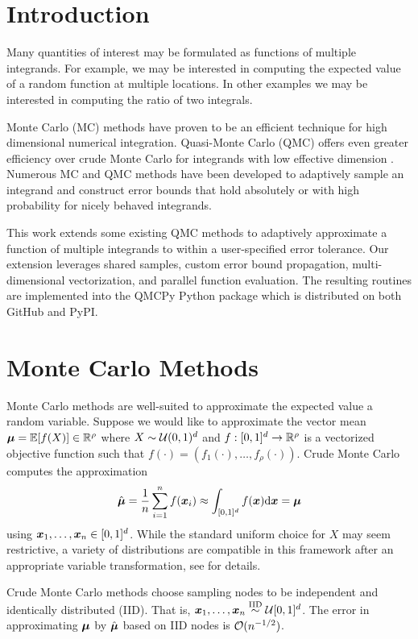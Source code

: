 \documentclass{article}[12pt]
\begin{document}
\section{Introduction}

Many quantities of interest may be formulated as functions of multiple integrands. For example, we may be interested in computing the expected value of a random function at multiple locations. In other examples we may be interested in computing the ratio of two integrals.

Monte Carlo (MC) methods have proven to be an efficient technique for high dimensional numerical integration. Quasi-Monte Carlo (QMC) offers even greater efficiency over crude Monte Carlo for integrands with low effective dimension . Numerous MC and QMC methods have been developed to adaptively sample an integrand and construct error bounds that hold absolutely or with high probability for nicely behaved integrands. 

This work extends some existing QMC methods to adaptively approximate a function of multiple integrands to within a user-specified error tolerance. Our extension leverages shared samples, custom error bound propagation, multi-dimensional vectorization, and parallel function evaluation. The resulting routines are implemented into the QMCPy Python package \cite{QMCPy} which is distributed on both GitHub and PyPI. 

\section{Monte Carlo Methods}

Monte Carlo methods are well-suited to approximate the expected value a random variable. Suppose we would like to approximate the vector mean $\boldsymbol{\mu} = \mathbb{E}[f(X)] \in \mathbb{R}^\rho$ where $X\sim\mathcal{U}(0,1)^d$ and  $f: [0,1]^d \to \mathbb{R}^\rho$ is a vectorized objective function such that $f(\cdot)=(f_1(\cdot),\dots,f_\rho(\cdot))$.  Crude Monte Carlo computes the approximation 
\begin{equation}
    \label{eq:mcapprox}
    \hat{\boldsymbol{\mu}} = \frac{1}{n}\sum_{i=1}^n f(\boldsymbol{x}_i) \approx \int_{[0,1]^d}f(\boldsymbol{x})\mathrm{d}\boldsymbol{x} = \boldsymbol{\mu}
\end{equation}
using $\boldsymbol{x}_1,\dots,\boldsymbol{x}_n \in [0,1]^d$. While the standard uniform choice for $X$ may seem restrictive, a variety of distributions are compatible in this framework after an appropriate variable transformation, see \cite{QMCSoftware} for details.

Crude Monte Carlo methods choose sampling nodes to be independent and identically distributed (IID). That is, $\boldsymbol{x}_1,\dots,\boldsymbol{x}_n \overset{\text{IID}}{\sim} \mathcal{U}[0,1]^d$.
The error in approximating $\boldsymbol{\mu}$ by $\hat{\boldsymbol{\mu}}$ based on IID nodes is  $\mathcal{O}(n^{-1/2})$. 
\end{document}

